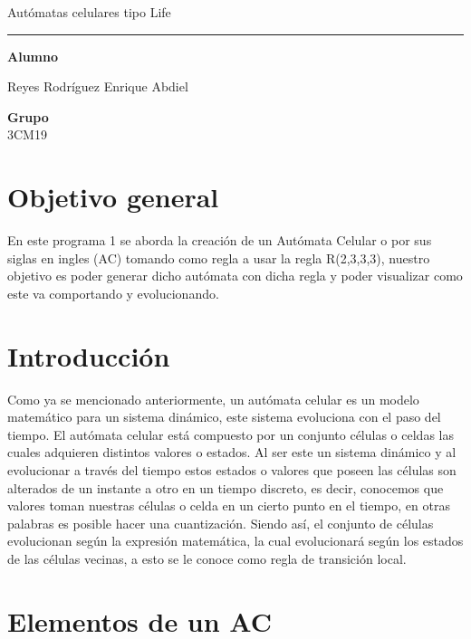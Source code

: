 \documentclass[10pt]{article}
\newcommand{\HRule}{\textcolor{blueTitle}{\rule{\linewidth}{0.5mm}}}
\begin{document}
\begin{center}
{        Autómatas celulares tipo Life}
        \HRule
        \vspace{1.5cm}

        \Large
        \textbf{Alumno} \\
        \vspace{.3cm}
       
        Reyes Rodríguez Enrique Abdiel\\
        \vspace{.3cm}
        \vspace{1cm}

        \Large
        \textbf{Grupo} \\
        \vspace{.3cm}
        3CM19
        \vspace{1cm}

    \end{center}
    
    \newpage
    \tableofcontents
    
    \section{Objetivo general}
        		En este programa 1 se aborda la creación de un Autómata Celular o por sus siglas en ingles (AC) tomando como regla a usar la regla R(2,3,3,3), nuestro objetivo es poder generar dicho autómata con dicha regla y poder visualizar como este va comportando y evolucionando.

    \section{Introducción}
Como ya se mencionado anteriormente, un autómata celular es un modelo matemático para un sistema dinámico, este sistema evoluciona con el paso del tiempo. El autómata celular está compuesto por un conjunto células o celdas las cuales adquieren distintos valores o estados. Al ser este un sistema dinámico y al evolucionar a través del tiempo estos estados o valores que poseen las células son alterados de un instante a otro en un tiempo discreto, es decir, conocemos que valores toman nuestras células o celda en un cierto punto en el tiempo, en otras palabras es posible hacer una cuantización.
Siendo así, el conjunto de células evolucionan según la expresión matemática, la cual evolucionará según los estados de las células vecinas, a esto se le conoce como regla de transición local.

	\section{Elementos de un AC}
\end{document}
